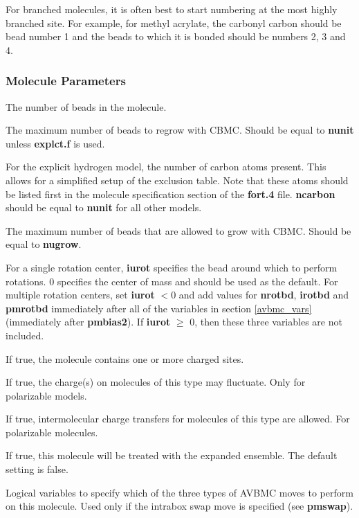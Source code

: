 \documentclass[12pt,letterpaper]{article}
\begin{document}
\noindent For branched molecules, it is often best to start numbering at the most highly branched site. 
For example, for methyl acrylate, the carbonyl carbon should be bead number 1 and the beads to which 
it is bonded should be numbers 2, 3 and 4.

\subsubsection{Molecule Parameters}

 The number of beads in the molecule.

 The maximum number of beads to regrow with CBMC.
Should be equal to {\textbf {nunit}} unless {\textbf {explct.f}} is used.

 For the explicit hydrogen model, the number of
carbon atoms present.  This allows for a simplified setup of the exclusion table.  
Note that these atoms should be listed first in the molecule specification section 
of the {\textbf{fort.4}} file.  
{\textbf{ncarbon}} should be equal to {\textbf{nunit}} for all other models.

 The maximum number of beads that are allowed to grow
with CBMC.  Should be equal to {\textbf {nugrow}}.

 For a single rotation center, {\bf iurot} specifies the bead around which to perform rotations.
0 specifies the center of mass and should be used as the default.
For multiple rotation centers, set {\bf iurot} $< 0$ and add values for \textbf {nrotbd}, \textbf {irotbd} and \textbf {pmrotbd}
immediately after all of the variables in section \ref{avbmc_vars} (immediately after {\bf pmbias2}).
If {\bf iurot} $\ge$ 0, then these three variables are not included. 

 If true, the molecule contains one or more charged sites.

 If true, the charge(s) on molecules of this type may fluctuate.
Only for polarizable models.

 If true, intermolecular charge transfers 
for molecules of this type are allowed.
For polarizable molecules.

 If true, this molecule will be treated with the expanded ensemble.
The default setting is false.

 Logical variables to specify which of the three types
of AVBMC moves to perform on this molecule.
Used only if the intrabox swap move is specified (see {\textbf{pmswap}}).
\end{document}
